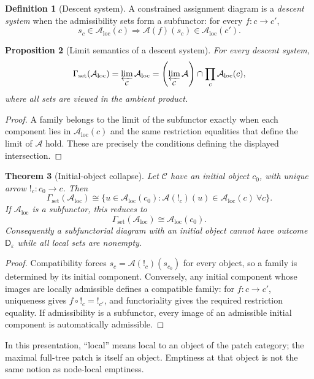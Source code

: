 \documentclass[11pt]{article}
\theoremstyle{plain}
\newtheorem{theorem}{Theorem}[section]
\newtheorem{proposition}[theorem]{Proposition}
\theoremstyle{definition}
\newtheorem{definition}[theorem]{Definition}
\theoremstyle{remark}
\newcommand{\LocalAdm}{\mathcal{A}_{\mathrm{loc}}}
\newcommand{\eps}{\varepsilon}
\begin{document}
\begin{definition}[Descent system]\label{def:Av}
A constrained assignment diagram is a \emph{descent system} when the
admissibility sets form a subfunctor: for every $f:c\to c'$,
\[
s_c\in\LocalAdm(c)
\Longrightarrow
\mathcal A(f)(s_c)\in\LocalAdm(c').
\]
\end{definition}

\begin{proposition}[Limit semantics of a descent system]\label{prop:limit-semantics}
For every descent system,
\[
\Gamma_{\mathrm{set}}(\LocalAdm)
=\varprojlim_{\mathcal C}\LocalAdm
=\left(\varprojlim_{\mathcal C}\mathcal A\right)
\cap\prod_c\LocalAdm(c),
\]
where all sets are viewed in the ambient product.
\end{proposition}

\begin{proof}
A family belongs to the limit of the subfunctor exactly when each component lies
in $\LocalAdm(c)$ and the same restriction equalities that define the limit of
$\mathcal A$ hold. These are precisely the conditions defining the displayed
intersection.
\end{proof}

\begin{theorem}[Initial-object collapse]\label{thm:initial-collapse}
Let $\mathcal C$ have an initial object $c_0$, with unique arrow
$!_c:c_0\to c$. Then
\[
\Gamma_{\mathrm{set}}(\LocalAdm)
\cong
\{u\in\LocalAdm(c_0):
\mathcal A(!_c)(u)\in\LocalAdm(c)\ \forall c\}.
\]
If $\LocalAdm$ is a subfunctor, this reduces to
\[
\Gamma_{\mathrm{set}}(\LocalAdm)\cong\LocalAdm(c_0).
\]
Consequently a subfunctorial diagram with an initial object cannot have outcome
$\mathsf D_\eps$ while all local sets are nonempty.
\end{theorem}

\begin{proof}
Compatibility forces $s_c=\mathcal A(!_c)(s_{c_0})$ for every object, so a
family is determined by its initial component. Conversely, any initial component
whose images are locally admissible defines a compatible family: for
$f:c\to c'$, uniqueness gives $f\circ !_c=!_{c'}$, and functoriality gives the
required restriction equality. If admissibility is a subfunctor, every image of
an admissible initial component is automatically admissible.
\end{proof}



In this presentation, ``local'' means local to an object of the patch category;
the maximal full-tree patch is itself an object. Emptiness at that object is not
the same notion as node-local emptiness.
\end{document}
